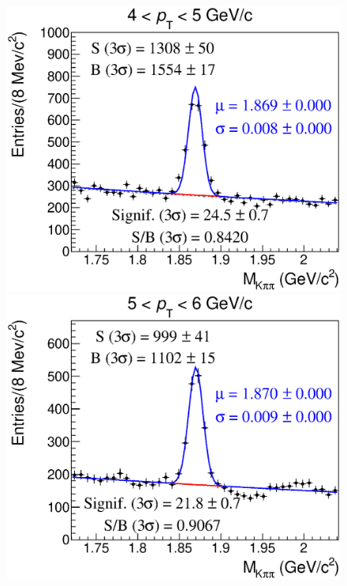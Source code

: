 \documentclass[b5paper,10pt,twoside,oldstyle,classica]{toptesi}
\begin{document}
\begin{figure}[h]
\begin{center}
{\includegraphics[scale = 0.25]{MassFitSet2_Pt2.eps}}
\hspace{0cm}
{\includegraphics[scale = 0.25]{MassFitSet2_Pt3.eps}}
\vspace{0cm}

\end{center}
\end{figure}
\end{document}
